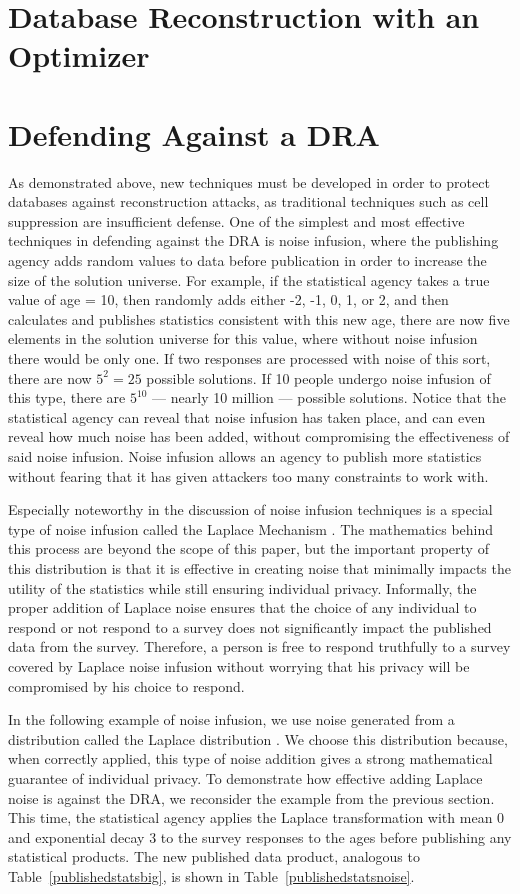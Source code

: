 \documentclass[5p,times,11pt]{elsarticle}
\begin{document}
\section{Database Reconstruction with an Optimizer}

\section{Defending Against a DRA}
As demonstrated above, new techniques must be developed in
order to protect databases against reconstruction attacks, as traditional techniques such as cell suppression are insufficient defense. One of the simplest and most effective techniques in defending against the DRA is noise infusion, where the publishing agency adds random values to data before publication in order to increase the size of the solution universe. For example, if the statistical agency takes a true value of age = 10, then randomly adds either -2, -1, 0, 1, or 2, and then calculates and publishes statistics consistent with this new age, there are now five elements in the solution universe for this value, where without noise infusion there would be only one. If two responses are processed with noise of this sort, there are now $5^2 = 25$ possible solutions. If 10 people undergo noise infusion of this type, there are $5^{10}$ --- nearly 10 million --- possible solutions. Notice that the statistical agency can reveal that noise infusion has taken place, and can even reveal how much noise has been added, without compromising the effectiveness of said noise infusion. Noise infusion allows an agency to publish more statistics without fearing that it has given attackers too many constraints to work with.

Especially noteworthy in the discussion of noise infusion techniques is a special type of noise infusion called the Laplace Mechanism .
The mathematics behind this process are beyond the scope of this paper, but the important property of this distribution is that it is effective in creating noise that minimally impacts the utility of the statistics while still ensuring individual privacy. Informally, the proper addition of Laplace noise ensures that the choice of any individual to respond or not respond to a survey does not significantly impact the published data from the survey. Therefore, a person is free to respond truthfully to a survey covered by Laplace noise infusion without worrying that his privacy will be compromised by his choice to respond.

In the following example of noise infusion, we use noise generated from a distribution called the Laplace distribution \cite{Dwork:2006:CNS:2180286.2180305}. We choose this distribution because, when correctly applied, this type of noise addition gives a strong mathematical guarantee of individual privacy. To demonstrate how effective adding Laplace noise is against the DRA, we reconsider the example from the previous section. This time, the statistical agency applies the Laplace transformation with mean 0 and exponential decay 3 to the survey responses to the ages before publishing any statistical products. The new published data product, analogous to Table~\ref{publishedstatsbig}, is shown in Table~\ref{publishedstatsnoise}.
\end{document}
